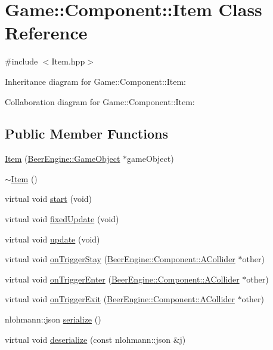 \hypertarget{class_game_1_1_component_1_1_item}{}\section{Game\+:\+:Component\+:\+:Item Class Reference}
\label{class_game_1_1_component_1_1_item}


{\ttfamily \#include $<$Item.\+hpp$>$}



Inheritance diagram for Game\+:\+:Component\+:\+:Item\+:


Collaboration diagram for Game\+:\+:Component\+:\+:Item\+:
\subsection*{Public Member Functions}
\begin{DoxyCompactItemize}
\item 
\mbox{\hyperlink{class_game_1_1_component_1_1_item_a55d47753d2ea3338e02453a2aeab78ff}{Item}} (\mbox{\hyperlink{class_beer_engine_1_1_game_object}{Beer\+Engine\+::\+Game\+Object}} $\ast$game\+Object)
\item 
\mbox{\hyperlink{class_game_1_1_component_1_1_item_a1ffc774ac5086f6f918d913f70e0322f}{$\sim$\+Item}} ()
\item 
virtual void \mbox{\hyperlink{class_game_1_1_component_1_1_item_a69276f0e6bbd44144a5618cfe89f526a}{start}} (void)
\item 
virtual void \mbox{\hyperlink{class_game_1_1_component_1_1_item_a3402bfd1509d12eb16fadbc37222406d}{fixed\+Update}} (void)
\item 
virtual void \mbox{\hyperlink{class_game_1_1_component_1_1_item_ac4e5deede6846817d6c818f8c8404fdc}{update}} (void)
\item 
virtual void \mbox{\hyperlink{class_game_1_1_component_1_1_item_a02230f3771a83e4a77035cb0ec4c04be}{on\+Trigger\+Stay}} (\mbox{\hyperlink{class_beer_engine_1_1_component_1_1_a_collider}{Beer\+Engine\+::\+Component\+::\+A\+Collider}} $\ast$other)
\item 
virtual void \mbox{\hyperlink{class_game_1_1_component_1_1_item_ae5369b261c5d6212de4b3f21ce02c672}{on\+Trigger\+Enter}} (\mbox{\hyperlink{class_beer_engine_1_1_component_1_1_a_collider}{Beer\+Engine\+::\+Component\+::\+A\+Collider}} $\ast$other)
\item 
virtual void \mbox{\hyperlink{class_game_1_1_component_1_1_item_a33c72fb48b46ce7b67b924472d0f3456}{on\+Trigger\+Exit}} (\mbox{\hyperlink{class_beer_engine_1_1_component_1_1_a_collider}{Beer\+Engine\+::\+Component\+::\+A\+Collider}} $\ast$other)
\item 
nlohmann\+::json \mbox{\hyperlink{class_game_1_1_component_1_1_item_a8aae88fd10b852e81fbaa16b5912a4ab}{serialize}} ()
\item 
virtual void \mbox{\hyperlink{class_game_1_1_component_1_1_item_a3a9cb5ba936a644f23976d9c9e9bbdce}{deserialize}} (const nlohmann\+::json \&j)
\end{DoxyCompactItemize}
